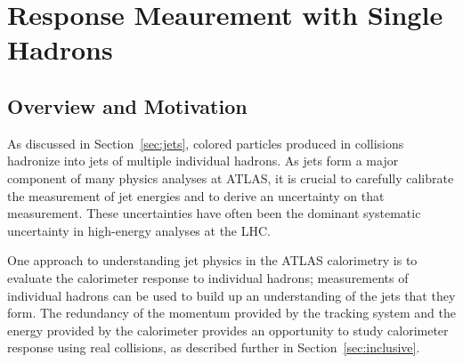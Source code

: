 \chapter{Response Meaurement with Single Hadrons}

\newcommand*{\pL}{\ensuremath{\Lambda}\xspace}
\newcommand*{\pLB}{\ensuremath{\bar{\Lambda}}\xspace}
\newcommand*{\pKS}{\ensuremath{K_\text{S}^{0}}\xspace}
\newcommand*{\pKL}{\ensuremath{K_L}\xspace}
\newcommand*{\pip}{\ensuremath{\pi^+}\xspace}
\newcommand*{\pim}{\ensuremath{\pi^-}\xspace}
\newcommand*{\piz}{\ensuremath{\pi^0}\xspace}
\newcommand*{\ep}{\ensuremath{E/p}\xspace}
\newcommand*{\epav}{\ensuremath{\langle E/p \rangle}\xspace}
\newcommand*{\epcor}{\ensuremath{\langle E/p \rangle_{\mathrm{COR}}}\xspace}
\newcommand*{\epbg}{\ensuremath{\langle E/p \rangle_{\mathrm{BG}}}\xspace}
\newcommand*{\Ea}{\ensuremath{E_a}\xspace}
\newcommand*{\QGSP}{\texttt{QGSP\_BERT}\xspace}
\newcommand*{\FTFP}{\texttt{FTFP\_BERT}\xspace}


\label{ch:singlehadrons}

\section{Overview and Motivation}

As discussed in Section~\ref{sec:jets}, colored particles produced in collisions hadronize into jets of multiple individual hadrons.
As jets form a major component of many physics analyses at ATLAS, it is crucial to carefully calibrate the measurement of jet energies and to derive an uncertainty on that measurement.
These uncertainties have often been the dominant systematic uncertainty in high-energy analyses at the LHC.

One approach to understanding jet physics in the ATLAS calorimetry is to evaluate the calorimeter response to individual hadrons; measurements of individual hadrons can be used to build up an understanding of the jets that they form.
The redundancy of the momentum provided by the tracking system and the energy provided by the calorimeter provides an opportunity to study calorimeter response using real collisions, as described further in Section~\ref{sec:inclusive}.


